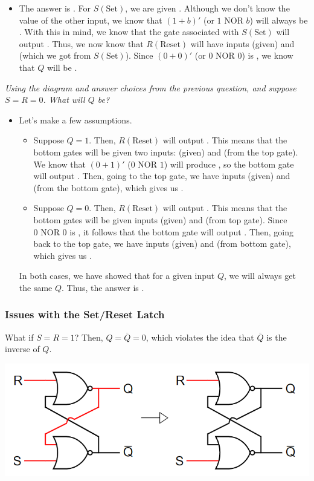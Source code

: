 \documentclass[letterpaper]{article}
\begin{document}
\begin{itemize}
    \item The answer is . For $S(\text{Set})$, we are given . Although we don't know the value of the other input, we know that $(1 + b)'$ (or $1 \text{ NOR } b$) will always be . With this in mind, we know that the gate associated with $S(\text{Set})$ will output . Thus, we now know that $R(\text{Reset})$ will have inputs  (given) and  (which we got from $S(\text{Set})$). Since $(0 + 0)'$ (or $0 \text{ NOR 0}$) is , we know that $Q$ will be . 
\end{itemize}

\bigskip 
\bigskip 

\emph{Using the diagram and answer choices from the previous question, and suppose $S = R = 0$. What will $Q$ be?}

\begin{itemize}
    \item Let's make a few assumptions.
    \begin{itemize}
        \item Suppose $Q = 1$. Then, $R(\text{Reset})$ will output . This means that the bottom gates will be given two inputs:  (given) and  (from the top gate). We know that $(0 + 1)'$ ($0 \text{ NOR } 1$) will produce , so the bottom gate will output . Then, going to the top gate, we have inputs  (given) and  (from the bottom gate), which gives us . 
        \item Suppose $Q = 0$. Then, $R(\text{Reset})$ will output . This means that the bottom gates will be given inputs  (given) and  (from top gate). Since $0 \text{ NOR } 0$ is , it follows that the bottom gate will output . Then, going back to the top gate, we have inputs  (given) and  (from bottom gate), which gives us . 
    \end{itemize}
    In both cases, we have showed that for a given input $Q$, we will always get the same $Q$. Thus, the answer is . 
\end{itemize}

\subsubsection{Issues with the Set/Reset Latch}
What if $S = R = 1$? Then, $Q = \overline{Q} = 0$, which violates the idea that $\overline{Q}$ is the inverse of $Q$.
\begin{center}
    \includegraphics[scale=0.5]{img/sr_bad_1.PNG}
\end{center}
\end{document}
